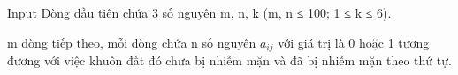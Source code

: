 Input
Dòng đầu tiên chứa 3 số nguyên m, n, k (m, n ≤ 100; 1 ≤ k ≤ 6).  

   m dòng tiếp theo, mỗi dòng chứa n số nguyên $a_{ij}$   với giá trị là 0 hoặc 1 tương đương với việc khuôn đất đó chưa bị nhiễm mặn và đã bị nhiễm mặn theo thứ tự.